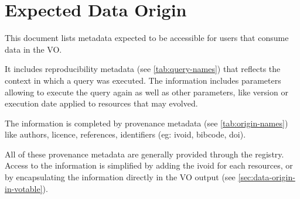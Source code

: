 \documentclass[11pt,a4paper]{ivoa}
\begin{document}
\section{Expected Data Origin}
This document lists metadata expected to be accessible for users that consume data in the VO. 

It includes reproducibility metadata (see \ref{tab:query-names}) that reflects the context in which a query was executed. The information includes parameters allowing to execute the query again as well as other parameters, like version or execution date applied to resources that may evolved.


The information is completed by provenance metadata (see \ref{tab:origin-names}) like authors, licence, references, identifiers (eg: ivoid, bibcode, doi). 

All of these provenance metadata are generally provided through the registry. Access to the information is simplified by adding the ivoid for each resources, or by encapsulating the information directly in the VO output (see \ref{sec:data-origin-in-votable}).


\end{document}
